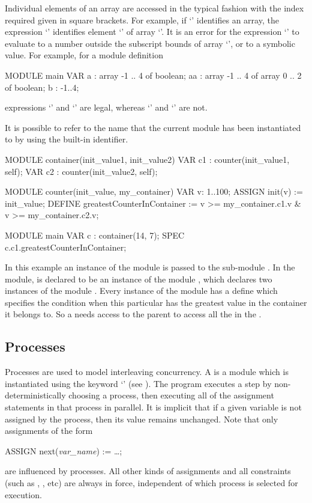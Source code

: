Individual elements of an array are accessed in the typical fashion
with the index required given in square brackets.
%
For example, if `' identifies an array, the expression
`' identifies element `' of array `'.
%
It is an error for the expression `' to evaluate to a number
outside the subscript bounds of array `', or to a symbolic
value. For example, for a module definition
%
\begin{nusmvCode}
MODULE main
 VAR
  a : array -1 .. 4 of boolean;
  aa : array -1 .. 4 of array 0 .. 2 of boolean;
  b : -1..4;
\end{nusmvCode}
%
expressions `' and `' are legal, whereas 
`' and `' are not.


It is possible to refer to the name that the current module has been
instantiated to by using the  built-in
identifier.
%
\begin{nusmvCode}
MODULE container(init_value1, init_value2)
  VAR c1 : counter(init_value1, self);
  VAR c2 : counter(init_value2, self);

MODULE counter(init_value, my_container)
  VAR v: 1..100;
  ASSIGN 
     init(v) := init_value;
  DEFINE 
     greatestCounterInContainer := v >= my_container.c1.v &
                                   v >= my_container.c2.v;

MODULE main
  VAR c : container(14, 7);
  SPEC
    c.c1.greatestCounterInContainer;
\end{nusmvCode}
%
In this example an instance of the module  is passed
to the sub-module . 
%
In the  module,  is declared to be an instance of
the module , which declares two instances of the module
.
%
Every instance of the  module has a define
 which specifies the condition when
this particular  has the greatest value in the container
it belongs to.  
%
So a  needs access to the parent  to
access all the  in the .


\subsection{Processes}
\label{Processes}
%
Processes are used to model interleaving concurrency. A 
is a module which is instantiated using the keyword `'
(see ). 
%
The program executes a step by non-deterministically choosing a
process, then executing all of the assignment statements in that
process in parallel. 
%
It is implicit that if a given variable is not assigned by the
process, then its value remains unchanged.
%
Note that only assignments of the form
%
\begin{nusmvCode}
ASSIGN next(\emph{var_name}) := \ldots ;
\end{nusmvCode}
%
are influenced by processes. All other kinds of assignments and
all constraints (such as , , etc) are always in
force, independent of which process is selected for execution.

